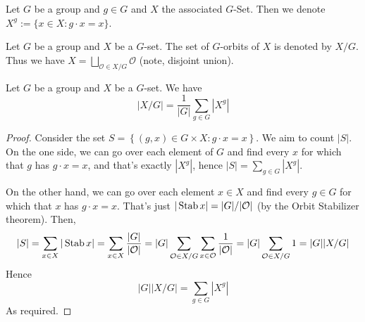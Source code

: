 \begin{definition}
    Let $G$ be a group and $g \in G$ and $X$ the associated $G$-Set. Then we denote $X^{g} := \{x \in X : g \cdot x = x\}$.
\end{definition}

\begin{definition}
  Let $G$ be a group and $X$ be a $G$-set. The set of $G$-orbits of $X$ is denoted by
  $X/G$. Thus we have $X=\bigsqcup_{\mathcal{O}\in X/G} \mathcal{O}$ (note, disjoint union).
\end{definition}

\begin{theorem}
  Let $G$ be a group and $X$ be a $G$-set. We have 
  \[|X/G|=\frac{1}{|G|}\sum_{g\in G} |X^g|\]
  \label{thm:notBurnside}
\end{theorem}
\begin{proof}
  Consider the set $S=\left\{ (g,x)\in G\times X : g \cdot x=x \right\}$. We aim to count $|S|$.
  On the one side, we can go over each element of $G$ and find every $x$ for which that
  $g$ has $g \cdot x=x$, and that's exactly $|X^g|$, hence $|S|=\sum_{g\in G} |X^g|$.

  On the other hand, we can go over each element $x\in X$ and find every $g\in G$ for which
  that $x$ has $g\cdot x=x$. That's just $|\operatorname*{Stab} x|= |G|/|\mathcal{O}|$ (by the Orbit Stabilizer
  theorem). Then, 
  \[|S|= \sum_{x\in X} |\operatorname*{Stab} x|= \sum_{x\in X} \frac{|G|}{|\mathcal{O}|}= |G|
  \sum_{\mathcal{O}\in X/G} \sum_{x\in \mathcal{O}} \frac{1}{|\mathcal{O}|}= |G|\sum_{\mathcal{O}\in X/G} 1 = |G||X/G|\]
  Hence
  \[|G||X/G| = \sum_{g\in G} |X^g|\]
  As required.
\end{proof}

